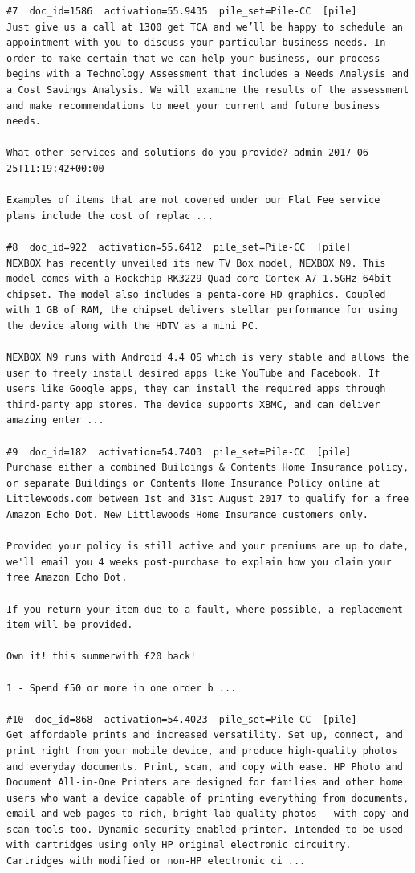 \begin{verbatim}
#7  doc_id=1586  activation=55.9435  pile_set=Pile-CC  [pile]
Just give us a call at 1300 get TCA and we’ll be happy to schedule an appointment with you to discuss your particular business needs. In order to make certain that we can help your business, our process begins with a Technology Assessment that includes a Needs Analysis and a Cost Savings Analysis. We will examine the results of the assessment and make recommendations to meet your current and future business needs.

What other services and solutions do you provide? admin 2017-06-25T11:19:42+00:00

Examples of items that are not covered under our Flat Fee service plans include the cost of replac ...

#8  doc_id=922  activation=55.6412  pile_set=Pile-CC  [pile]
NEXBOX has recently unveiled its new TV Box model, NEXBOX N9. This model comes with a Rockchip RK3229 Quad-core Cortex A7 1.5GHz 64bit chipset. The model also includes a penta-core HD graphics. Coupled with 1 GB of RAM, the chipset delivers stellar performance for using the device along with the HDTV as a mini PC.

NEXBOX N9 runs with Android 4.4 OS which is very stable and allows the user to freely install desired apps like YouTube and Facebook. If users like Google apps, they can install the required apps through third-party app stores. The device supports XBMC, and can deliver amazing enter ...

#9  doc_id=182  activation=54.7403  pile_set=Pile-CC  [pile]
Purchase either a combined Buildings & Contents Home Insurance policy, or separate Buildings or Contents Home Insurance Policy online at Littlewoods.com between 1st and 31st August 2017 to qualify for a free Amazon Echo Dot. New Littlewoods Home Insurance customers only.

Provided your policy is still active and your premiums are up to date, we'll email you 4 weeks post-purchase to explain how you claim your free Amazon Echo Dot.

If you return your item due to a fault, where possible, a replacement item will be provided.

Own it! this summerwith £20 back!

1 - Spend £50 or more in one order b ...

#10  doc_id=868  activation=54.4023  pile_set=Pile-CC  [pile]
Get affordable prints and increased versatility. Set up, connect, and print right from your mobile device, and produce high-quality photos and everyday documents. Print, scan, and copy with ease. HP Photo and Document All-in-One Printers are designed for families and other home users who want a device capable of printing everything from documents, email and web pages to rich, bright lab-quality photos - with copy and scan tools too. Dynamic security enabled printer. Intended to be used with cartridges using only HP original electronic circuitry. Cartridges with modified or non-HP electronic ci ...

\end{verbatim}

